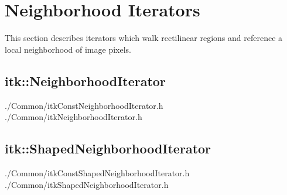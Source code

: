 \section{Neighborhood Iterators}
\label{sec:NeighborhoodIterators}
This section describes iterators which walk rectilinear regions and reference a
local neighborhood of image pixels.




\subsection{itk::NeighborhoodIterator}
\label{sec:itkNeighborhoodIterator}
./Common/itkConstNeighborhoodIterator.h
./Common/itkNeighborhoodIterator.h

\subsection{itk::ShapedNeighborhoodIterator}
\label{sec:itkShapedNeighborhoodIterator}
./Common/itkConstShapedNeighborhoodIterator.h
./Common/itkShapedNeighborhoodIterator.h






















